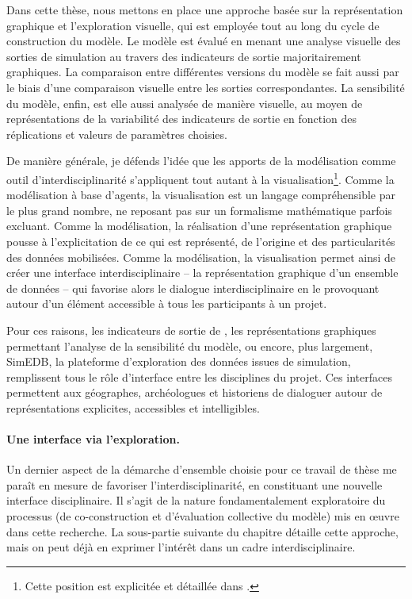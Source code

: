 Dans cette thèse, nous mettons en place une approche basée sur la représentation graphique et l'exploration visuelle, qui est employée tout au long du cycle de construction du modèle.
Le modèle est évalué en menant une analyse visuelle des sorties de simulation au travers des indicateurs de sortie majoritairement graphiques.
La comparaison entre différentes versions du modèle se fait aussi par le biais d'une comparaison visuelle entre les sorties correspondantes.
La sensibilité du modèle, enfin, est elle aussi analysée de manière visuelle, au moyen de représentations de la variabilité des indicateurs de sortie en fonction des réplications et valeurs de paramètres choisies.

De manière générale, je défends l'idée que les apports de la modélisation comme outil d'interdisciplinarité s'appliquent tout autant à la visualisation\footnote{
	Cette position est explicitée et détaillée dans \textcite{cura_visualisation_2020}.
}.
Comme la modélisation à base d'agents, la visualisation est un \og langage\fg{} compréhensible par le plus grand nombre, ne reposant pas sur un formalisme mathématique parfois excluant.
Comme la modélisation, la réalisation d'une représentation graphique pousse à l'explicitation de ce qui est représenté, de l'origine et des particularités des données mobilisées.
Comme la modélisation, la visualisation permet ainsi de créer une interface interdisciplinaire -- la représentation graphique d'un ensemble de données -- qui favorise alors le dialogue interdisciplinaire en le provoquant autour d'un élément accessible à tous les participants à un projet.

Pour ces raisons, les indicateurs de sortie de \simfeodal{}, les représentations graphiques permettant l'analyse de la sensibilité du modèle, ou encore, plus largement, SimEDB, la plateforme d'exploration des données issues de simulation, remplissent tous le rôle d'interface entre les disciplines du projet.
Ces interfaces permettent aux géographes, archéologues et historiens de dialoguer autour de représentations explicites, accessibles et intelligibles.


\paragraph{Une interface via l'exploration.}

Un dernier aspect de la démarche d'ensemble choisie pour ce travail de thèse me paraît en mesure de favoriser l'interdisciplinarité, en constituant une nouvelle interface disciplinaire.
Il s'agit de la nature fondamentalement exploratoire du processus (de co-construction et d'évaluation collective du modèle) mis en œuvre dans cette recherche.
La sous-partie suivante du chapitre détaille cette approche, mais on peut déjà en exprimer l'intérêt dans un cadre interdisciplinaire.

